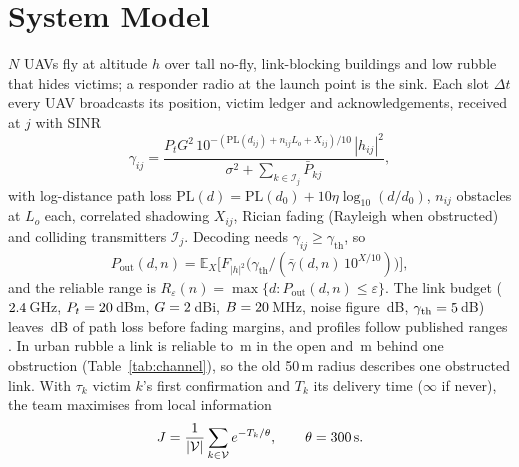 \documentclass{IOS-Book-Article}
\newif\ifhighlight
\newenvironment{revised}{\ifhighlight\color{blue}\fi}{}
\begin{document}
\section{System Model}\label{sec:model}
\begin{revised}
$N$ UAVs fly at altitude $h$ over tall no-fly, link-blocking buildings and low rubble that hides
victims; a responder radio at the launch point is the sink. Each slot $\Delta t$ every UAV
broadcasts its position, victim ledger and acknowledgements, received at $j$ with SINR
\begin{equation}
\gamma_{ij}=\frac{P_tG^2\,10^{-(\mathrm{PL}(d_{ij})+n_{ij}L_o+X_{ij})/10}\,|h_{ij}|^2}{\sigma^2+\sum_{k\in\mathcal{I}_j}\bar P_{kj}},\label{eq:sinr}
\end{equation}
with log-distance path loss $\mathrm{PL}(d)=\mathrm{PL}(d_0)+10\eta\log_{10}(d/d_0)$, $n_{ij}$
obstacles at $L_o$ each, correlated shadowing $X_{ij}$, Rician fading (Rayleigh when obstructed) and
colliding transmitters $\mathcal{I}_j$. Decoding needs $\gamma_{ij}\ge\gamma_{\mathrm{th}}$, so
\begin{equation}
P_{\mathrm{out}}(d,n)=\mathbb{E}_X\big[F_{|h|^2}\big(\gamma_{\mathrm{th}}/(\bar\gamma(d,n)\,10^{X/10})\big)\big],\label{eq:pout}
\end{equation}
and the reliable range is $R_\varepsilon(n)=\max\{d:P_{\mathrm{out}}(d,n)\le\varepsilon\}$. The link
budget ($2.4$\,GHz, $P_t=20$\,dBm, $G=2$\,dBi, $B=20$\,MHz, noise figure \nNF\,dB,
$\gamma_{\mathrm{th}}=5$\,dB) leaves \nBudget\,dB of path loss before fading margins, and profiles
follow published ranges \cite{tr36777,itup1411}. In urban rubble a link is reliable to
\nRurbanZero\,m in the open and \nRurbanOne\,m behind one obstruction (Table~\ref{tab:channel}), so the
old 50\,m radius describes one obstructed link. With $\tau_k$ victim $k$'s first confirmation and
$T_k$ its delivery time ($\infty$ if never), the team maximises from local information
\begin{equation}
J=\frac{1}{|\mathcal{V}|}\sum_{k\in\mathcal{V}}e^{-T_k/\theta},\qquad\theta=300\,\mathrm{s}.\label{eq:J}
\end{equation}
\end{revised}

\end{document}
